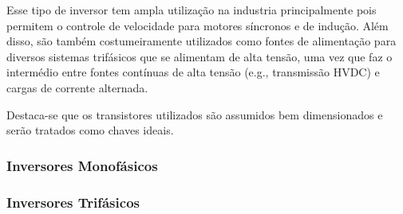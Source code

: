 Esse tipo de inversor tem ampla utilização na industria principalmente pois permitem o controle de velocidade para motores síncronos e de indução. Além disso, são também costumeiramente utilizados como fontes de alimentação para diversos sistemas trifásicos que se alimentam de alta tensão, uma vez que faz o intermédio entre fontes contínuas de alta tensão (e.g., transmissão HVDC) e cargas de corrente alternada.

Destaca-se que os transistores utilizados são assumidos bem dimensionados e serão tratados como chaves ideais.

\subsubsection{Inversores Monofásicos}


 
\subsubsection{Inversores Trifásicos}



